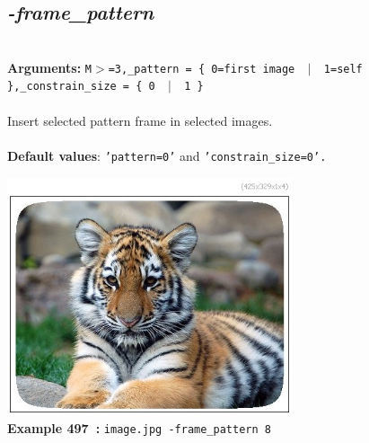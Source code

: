 \documentclass[a4paper,11pt,twoside]{book}
\begin{document}
\subsection{\emph{-frame\_pattern} }\vspace*{-0.5em}
~\\\textbf{Arguments: } 
{\small \texttt{M$>$=3,\_pattern = \{ 0=first image ~$|$~ 1=self \},\_constrain\_size = \{ 0 ~$|$~ 1 \}}}\\~\\
Insert selected pattern frame in selected images.
~\\~\\\textbf{Default values}: {\small \texttt{'pattern=0'} and \texttt{'constrain\_size=0'.}}
\begin{center}\includegraphics[keepaspectratio=true,height=7cm,width=\textwidth]{img/gmic_def497.jpg}\\
{\footnotesize \textbf{Example 497~:} \texttt{image.jpg -frame\_pattern 8}}
\end{center}
\end{document}
